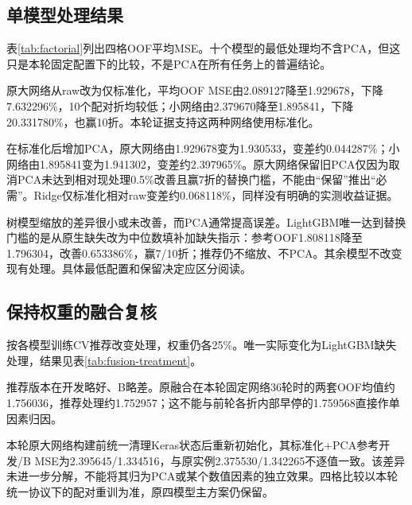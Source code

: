 \subsection{单模型处理结果}
表\ref{tab:factorial}列出四格OOF平均MSE。十个模型的最低处理均不含PCA，但这只是本轮固定配置下的比较，不是PCA在所有任务上的普遍结论。


原大网络从raw改为仅标准化，平均OOF MSE由2.089127降至1.929678，下降7.632296\%，10个配对折均较低；小网络由2.379670降至1.895841，下降20.331780\%，也赢10折。本轮证据支持这两种网络使用标准化。

在标准化后增加PCA，原大网络由1.929678变为1.930533，变差约0.044287\%；小网络由1.895841变为1.941302，变差约2.397965\%。原大网络保留旧PCA仅因为取消PCA未达到相对现处理0.5\%改善且赢7折的替换门槛，不能由“保留”推出“必需”。Ridge仅标准化相对raw变差约0.068118\%，同样没有明确的实测收益证据。

树模型缩放的差异很小或未改善，而PCA通常提高误差。LightGBM唯一达到替换门槛的是从原生缺失改为中位数填补加缺失指示：参考OOF1.808118降至1.796304，改善0.653386\%，赢7/10折；推荐仍不缩放、不PCA。其余模型不改变现有处理。具体最低配置和保留决定应区分阅读。

\subsection{保持权重的融合复核}
按各模型训练CV推荐改变处理，权重仍各25\%。唯一实际变化为LightGBM缺失处理，结果见表\ref{tab:fusion-treatment}。


推荐版本在开发略好、B略差。原融合在本轮固定网络36轮时的两套OOF均值约1.756036，推荐处理约1.752957；这不能与前轮各折内部早停的1.759568直接作单因素归因。

本轮原大网络构建前统一清理Keras状态后重新初始化，其标准化+PCA参考开发/B MSE为2.395645/1.334516，与原实例2.375530/1.342265不逐值一致。该差异未进一步分解，不能将其归为PCA或某个数值因素的独立效果。四格比较以本轮统一协议下的配对重训为准，原四模型主方案仍保留。

